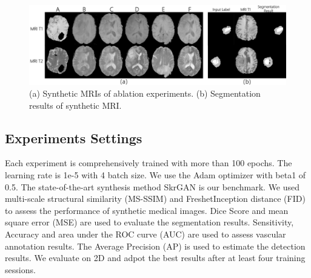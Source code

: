 \documentclass[runningheads]{llncs}
\begin{document}
	\begin{figure}[th]
		\centering
		\includegraphics[width=0.9\linewidth]{figures/ablation}
		\caption{(a) Synthetic MRIs of ablation experiments. (b) Segmentation results of synthetic MRI. }
		\label{ablation_and_seg}
	\end{figure}
	\begin{table}[th]
		\begin{center}
			\caption{Lesion generation methods experiments.}
			\label{label_test}
		\end{center}
	\end{table}
	\subsection{Experiments Settings}
	Each experiment is comprehensively trained with more than 100 epochs. The learning rate is 1e-5 with 4 batch size. We use the Adam optimizer with beta1 of 0.5.
	The state-of-the-art synthesis method SkrGAN\cite{96zhang2019skrgan:} is our benchmark. We used multi-scale structural similarity (MS-SSIM) and FreshetInception distance (FID)\cite{100karras2017progressive} to assess the performance of synthetic medical images. Dice Score\cite {95dice1945measures} and mean square error (MSE) are used to evaluate the segmentation results. Sensitivity, Accuracy and area under the ROC curve (AUC) are used to assess vascular annotation results. The Average Precision (AP) is used to estimate the detection results. We evaluate on 2D and adpot the best results after at least four training sessions.	
\end{document}
